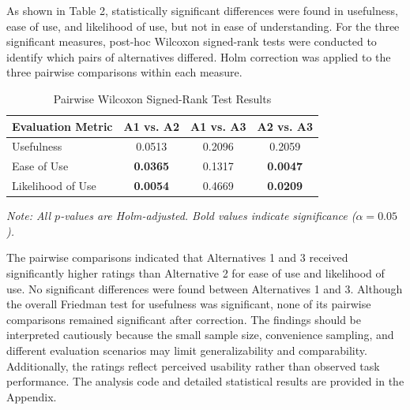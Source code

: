 \documentclass[letterpaper]{jdf}
\begin{document}
As shown in Table 2, statistically significant differences were found in usefulness, ease of use, and likelihood of use, but not in ease of understanding.
For the three significant measures, post-hoc Wilcoxon signed-rank tests were conducted to identify which pairs of alternatives differed. Holm correction was applied to the three pairwise comparisons within each measure.


\begin{table}[!htbp]
    \centering
    \small
    \setlength{\tabcolsep}{6pt}
    \caption{Pairwise Wilcoxon Signed-Rank Test Results}
    \label{tab:wilcoxon}
    \begin{tabular}{lccc}
        \toprule
        Evaluation Metric & A1 vs. A2 & A1 vs. A3 & A2 vs. A3 \\
        \midrule
        Usefulness        & 0.0513 & 0.2096 & 0.2059 \\
        Ease of Use       & \textbf{0.0365} & 0.1317 & \textbf{0.0047} \\
        Likelihood of Use & \textbf{0.0054} & 0.4669 & \textbf{0.0209} \\
        \bottomrule
    \end{tabular}

    \vspace{2pt}
    {\footnotesize \textit{Note: All $p$-values are Holm-adjusted. Bold values indicate significance ($\alpha=0.05$).}}
\end{table}

The pairwise comparisons indicated that Alternatives 1 and 3 received significantly higher ratings than Alternative 2 for ease of use and likelihood of use. No significant differences were found between Alternatives 1 and 3. Although the overall Friedman test for usefulness was significant, none of its pairwise comparisons remained significant after correction.
The findings should be interpreted cautiously because the small sample size, convenience sampling, and different evaluation scenarios may limit generalizability and comparability. Additionally, the ratings reflect perceived usability rather than observed task performance. The analysis code and detailed statistical results are provided in the Appendix.
\end{document}
